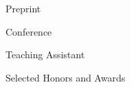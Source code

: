 \documentclass{resume} %
\begin{document}
\begin{rSection}{Preprint}


\end{rSection}



\begin{rSection}{Conference}


\end{rSection}



\begin{rSection}{Teaching Assistant}
\noindent$
\begin{array}{ll}
\end{array}
$

\end{rSection}


\begin{rSection}{Selected Honors and Awards}
\begin{itemize}


\end{itemize}
    
\end{rSection}
\end{document}

